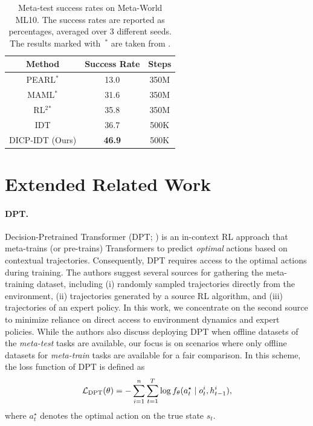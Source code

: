 \documentclass{article}
\begin{document}
\begin{table}[h]
    \caption{Meta-test success rates on Meta-World ML10.
    The success rates are reported as percentages, averaged over 3 different seeds.
    The results marked with~$^*$ are taken from \citet{MW}.
    }
    \label{tab:results_ml10}
    \small \centering
    \begin{tabular}{ccc}
    \toprule
    Method & Success Rate & Steps\\
    \midrule
    PEARL$^*$ & 13.0 & 350M \\
    MAML$^*$ & 31.6 & 350M \\
    RL$^2$$^*$ & 35.8 & 350M \\
    \midrule
    IDT & 36.7 & 500K\\
    \midrule
    DICP-IDT (Ours) & \textbf{46.9} & 500K \\
    \bottomrule
    \end{tabular}
\end{table}

\section{Extended Related Work}
\label{sec:rel_ext}

\paragraph*{DPT.}
Decision-Pretrained Transformer (DPT; \citet{DPT}) is an in-context RL approach that meta-trains (or pre-trains) Transformers to predict \emph{optimal} actions based on contextual trajectories.
Consequently, DPT requires access to the optimal actions during training.
The authors suggest several sources for gathering the meta-training dataset, including (i) randomly sampled trajectories directly from the environment, (ii) trajectories generated by a source RL algorithm, and (iii) trajectories of an expert policy.
In this work, we concentrate on the second source to minimize reliance on direct access to environment dynamics and expert policies.
While the authors also discuss deploying DPT when offline datasets of the \emph{meta-test} tasks are available, our focus is on scenarios where only offline datasets for \emph{meta-train} tasks are available for a fair comparison.
In this scheme, the loss function of DPT is defined as
\begin{equation}
    {\mathcal{L}}_{\textrm{DPT}}(\theta) = - \sum_{i=1}^n \sum_{t=1}^{T} \log f_\theta(a_t^\star \mid o_t^i, h_{t-1}^i),
    \label{eq:dpt}
  \end{equation}
where $a_t^\star$ denotes the optimal action on the true state $s_t$.
\end{document}

